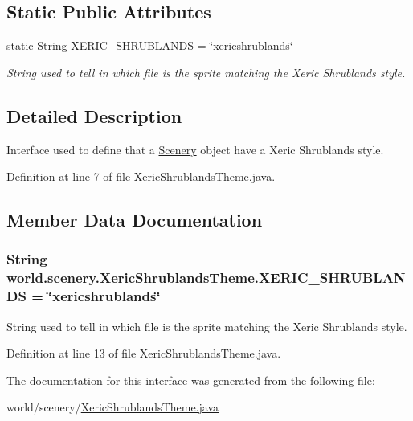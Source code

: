 \subsection*{Static Public Attributes}
\begin{DoxyCompactItemize}
\item 
static String \hyperlink{interfaceworld_1_1scenery_1_1_xeric_shrublands_theme_a03cab029cbad9fdfa722122d3393c06c}{X\-E\-R\-I\-C\-\_\-\-S\-H\-R\-U\-B\-L\-A\-N\-D\-S} = \char`\"{}xericshrublands\char`\"{}
\begin{DoxyCompactList}\small\item\em String used to tell in which file is the sprite matching the Xeric Shrublands style. \end{DoxyCompactList}\end{DoxyCompactItemize}


\subsection{Detailed Description}
Interface used to define that a \hyperlink{classworld_1_1scenery_1_1_scenery}{Scenery} object have a Xeric Shrublands style. 

Definition at line 7 of file Xeric\-Shrublands\-Theme.\-java.



\subsection{Member Data Documentation}
\hypertarget{interfaceworld_1_1scenery_1_1_xeric_shrublands_theme_a03cab029cbad9fdfa722122d3393c06c}{
\subsubsection[{X\-E\-R\-I\-C\-\_\-\-S\-H\-R\-U\-B\-L\-A\-N\-D\-S}]{\setlength{\rightskip}{0pt plus 5cm}String world.\-scenery.\-Xeric\-Shrublands\-Theme.\-X\-E\-R\-I\-C\-\_\-\-S\-H\-R\-U\-B\-L\-A\-N\-D\-S = \char`\"{}xericshrublands\char`\"{}\hspace{0.3cm}{\ttfamily [static]}}}\label{interfaceworld_1_1scenery_1_1_xeric_shrublands_theme_a03cab029cbad9fdfa722122d3393c06c}


String used to tell in which file is the sprite matching the Xeric Shrublands style. 



Definition at line 13 of file Xeric\-Shrublands\-Theme.\-java.



The documentation for this interface was generated from the following file\-:\begin{DoxyCompactItemize}
\item 
world/scenery/\hyperlink{_xeric_shrublands_theme_8java}{Xeric\-Shrublands\-Theme.\-java}\end{DoxyCompactItemize}
